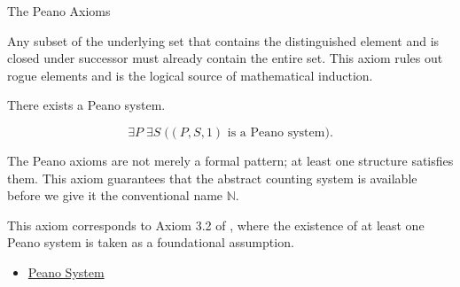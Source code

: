 \begin{topicbox}{The Peano Axioms}
\begin{remark*}[Interpretation]
Any subset of the underlying set that contains the distinguished element and is
closed under successor must already contain the entire set. This axiom rules
out rogue elements and is the logical source of mathematical induction.
\end{remark*}

\NoLocalDependencies

\begin{tcolorbox}[colback=axiombox, colframe=axiomborder, arc=2pt,
  left=6pt, right=6pt, top=4pt, bottom=4pt,
  title={\small\textbf{Axiom (Existence of a Peano System)}},
  fonttitle=\small\bfseries]
\begin{axiom}
\label{ax:peano-system-existence}
There exists a Peano system.
\end{axiom}
\end{tcolorbox}

\begin{remark*}
\[
\exists P\;\exists S\;\bigl((P,S,1)\text{ is a Peano system}\bigr).
\]
\end{remark*}

\begin{remark*}[Interpretation]
The Peano axioms are not merely a formal pattern; at least one structure
satisfies them. This axiom guarantees that the abstract counting system is
available before we give it the conventional name $\mathbb{N}$.
\end{remark*}

\begin{remark*}
This axiom corresponds to Axiom 3.2 of
\citet{FefermanNumberSystems1964}, where the existence of at least one Peano
system is taken as a foundational assumption.
\end{remark*}

\begin{dependencies}
\begin{itemize}
  \item \hyperref[def:peano-system]{Peano System}
\end{itemize}
\end{dependencies}
\end{topicbox}

